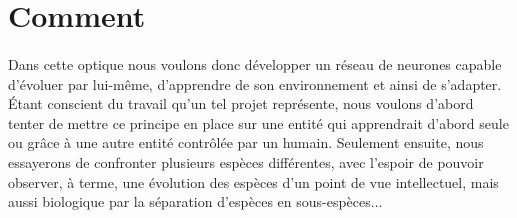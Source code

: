 \documentclass[a4paper, 12pts]{article}
\begin{document}
\section{Comment}
\paragraph{}
	Dans cette optique nous voulons donc développer un réseau de neurones capable d'évoluer par lui-même, d'apprendre de son environnement et ainsi de s'adapter. Étant conscient du travail qu'un tel projet représente, nous voulons d'abord tenter de mettre ce principe en place sur une entité qui apprendrait d'abord seule ou grâce à une autre entité contrôlée par un humain. Seulement ensuite, nous essayerons de confronter plusieurs espèces différentes, avec l'espoir de pouvoir observer, à terme, une évolution des espèces d'un point de vue intellectuel, mais aussi biologique par la séparation d'espèces en sous-espèces...
\end{document}

